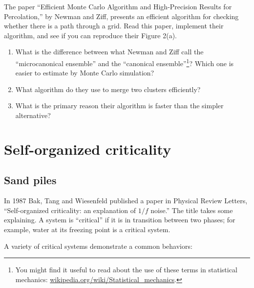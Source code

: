 \documentclass[10pt]{book}
\begin{document}
\begin{ex}

The paper ``Efficient Monte Carlo Algorithm and High-Precision Results
for Percolation,'' by Newman and Ziff, presents an efficient algorithm
for checking whether there is a path through a grid.  Read this
paper, implement their algorithm, and see if you can reproduce their
Figure 2(a).

\begin{enumerate}

\item What is the difference between what Newman and Ziff call the
  ``microcanonical ensemble'' and the ``canonical
  ensemble''\footnote{You might find it useful to read about the use of
    these terms in statistical mechanics:
    \url{wikipedia.org/wiki/Statistical_mechanics}.}?  Which one is
  easier to estimate by Monte Carlo simulation?

\item What algorithm do they use to merge two clusters efficiently? 

\item What is the primary reason their algorithm is faster than the
  simpler alternative?

\end{enumerate}
 
\end{ex}




\chapter{Self-organized criticality}

\section{Sand piles}

In 1987 Bak, Tang and Wiesenfeld published a paper in Physical Review
Letters, ``Self-organized criticality: an explanation of $1/f$ noise.''
The title takes some explaining.  A system is ``critical'' if it is
in transition between two phases; for example, water at
its freezing point is a critical system.

A variety of critical systems demonstrate a common behaviors:
\end{document}
